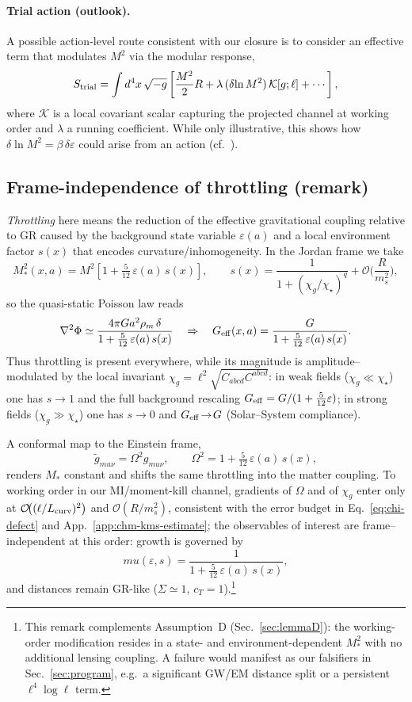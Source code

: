 \documentclass[aps,prd,onecolumn,superscriptaddress,nofootinbib]{revtex4-2}
\def\mu{mu}%
\def\Omega_\Lambda{OmegaLambda}%
\begin{document}
\paragraph{Trial action (outlook).}
A possible action-level route consistent with our closure is to consider an effective term that modulates \(M^2\) via the modular response,
\[
S_{\rm trial}=\int d^4x \,\sqrt{-g}\left[\frac{M^2}{2}R + \lambda\,(\delta\!\ln M^2)\,\mathcal{K}[g;\ell] + \cdots\right],
\]
where \(\mathcal K\) is a local covariant scalar capturing the projected channel at working order and \(\lambda\) a running coefficient. While only illustrative, this shows how \(\delta\!\ln M^2=\beta\,\delta\varepsilon\) could arise from an action (cf.\ \cite{Jacobson2016,Lashkari2014}).

\subsection{Frame-independence of throttling (remark)}
\label{sec:throttle-remark}
\emph{Throttling} here means the reduction of the effective gravitational coupling relative to GR caused by the background state variable \(\varepsilon(a)\) and a local environment factor \(s(x)\) that encodes curvature/inhomogeneity.
In the Jordan frame we take
\[
M_*^2(x,a)=M^2\!\left[1+\tfrac{5}{12}\,\varepsilon(a)\,s(x)\right],\qquad
s(x)=\frac{1}{1+(\chi_g/\chi_\star)^q}+\mathcal O\!\Big(\frac{R}{m_s^2}\Big),
\]
so the quasi-static Poisson law reads
\[
\nabla^2\Phi \simeq \frac{4\pi G a^2 \rho_m\,\delta}{1+\tfrac{5}{12}\,\varepsilon(a)\,s(x)}
\quad\Rightarrow\quad
G_{\rm eff}(x,a)=\frac{G}{1+\tfrac{5}{12}\,\varepsilon(a)\,s(x)}.
\]
Thus throttling is present everywhere, while its magnitude is amplitude–modulated by the local invariant \(\chi_g=\ell^2\sqrt{C_{abcd}C^{abcd}}\): in weak fields (\(\chi_g\!\ll\!\chi_\star\)) one has \(s\!\to\!1\) and the full background rescaling \(G_{\rm eff}=G/(1+\tfrac{5}{12}\varepsilon)\); in strong fields (\(\chi_g\!\gg\!\chi_\star\)) one has \(s\!\to\!0\) and \(G_{\rm eff}\!\to\!G\) (Solar–System compliance).

A conformal map to the Einstein frame,
\[
\tilde g_{\mu\nu}=\Omega^2 g_{\mu\nu},\qquad \Omega^2=1+\tfrac{5}{12}\,\varepsilon(a)\,s(x),
\]
renders \(M_*\) constant and shifts the same throttling into the matter coupling. To working order in our MI/moment-kill channel, gradients of \(\Omega\) and of \(\chi_g\) enter only at \(\mathcal O\!\big((\ell/L_{\rm curv})^2\big)\) and \(\mathcal O(R/m_s^2)\), consistent with the error budget in Eq.~\eqref{eq:chi-defect} and App.~\ref{app:chm-kms-estimate}; the observables of interest are frame–independent at this order: growth is governed by
\[
\mu(\varepsilon,s)=\frac{1}{1+\tfrac{5}{12}\,\varepsilon(a)\,s(x)},
\]
and distances remain GR-like (\(\Sigma\simeq 1\), \(c_T=1\)).\footnote{This remark complements Assumption~D (Sec.~\ref{sec:lemmaD}): the working-order modification resides in a state- and environment-dependent \(M_*^2\) with no additional lensing coupling. A failure would manifest as our falsifiers in Sec.~\ref{sec:program}, e.g.\ a significant GW/EM distance split or a persistent \(\ell^4\log\ell\) term.}
\end{document}
